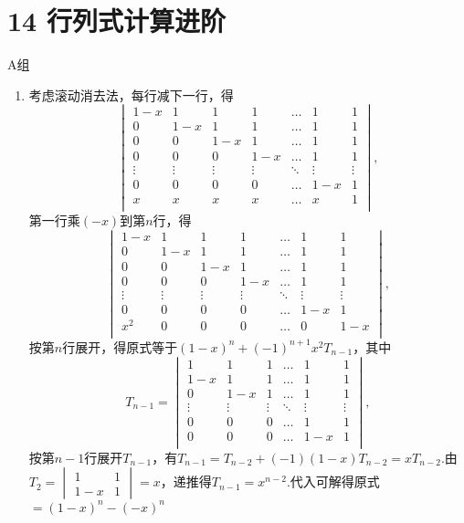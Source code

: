 \section*{14 行列式计算进阶}

\vspace{2ex}

\centerline{\heiti A组}
\begin{enumerate}
    \item 考虑滚动消去法，每行减下一行，得
    \[
    \begin{vmatrix}
    1-x&1&1&1&\ldots&1&1\\
    0&1-x&1&1&\ldots&1&1\\
    0&0&1-x&1&\ldots&1&1\\
    0&0&0&1-x&\ldots&1&1\\
    \vdots&\vdots&\vdots&\vdots&\ddots&\vdots&\vdots\\
    0&0&0&0&\ldots&1-x&1\\
    x&x&x&x&\ldots&x&1\\
    \end{vmatrix},\]
    第一行乘$(-x)$到第$n$行，得\[\begin{vmatrix}
    1-x&1&1&1&\ldots&1&1\\
    0&1-x&1&1&\ldots&1&1\\
    0&0&1-x&1&\ldots&1&1\\
    0&0&0&1-x&\ldots&1&1\\
    \vdots&\vdots&\vdots&\vdots&\ddots&\vdots&\vdots\\
    0&0&0&0&\ldots&1-x&1\\
    x^2&0&0&0&\ldots&0&1-x\\
    \end{vmatrix},\]
    按第$n$行展开，得原式等于$(1-x)^n+(-1)^{n+1}x^2T_{n-1}$，其中\[T_{n-1}=\begin{vmatrix}
    1&1&1&\ldots&1&1\\
    1-x&1&1&\ldots&1&1\\
    0&1-x&1&\ldots&1&1\\
    \vdots&\vdots&\vdots&\ddots&\vdots&\vdots\\
    0&0&0&\ldots&1&1\\
    0&0&0&\ldots&1-x&1\\
    \end{vmatrix},\]
    按第$n-1$行展开$T_{n-1}$，有$T_{n-1}=T_{n-2}+(-1)(1-x)T_{n-2}=xT_{n-2}$.由$T_2=\begin{vmatrix}
    1&1\\1-x&1\end{vmatrix}=x$，递推得$T_{n-1}=x^{n-2}$.代入可解得原式$=(1-x)^n-(-x)^n$


\end{enumerate}

